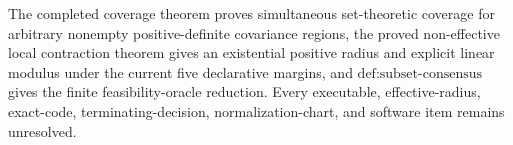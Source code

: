 The completed coverage theorem proves simultaneous set-theoretic coverage for arbitrary nonempty positive-definite covariance regions, the proved non-effective local contraction theorem gives an existential positive radius and explicit linear modulus under the current five declarative margins, and \(\text{def:subset-consensus}\) gives the finite feasibility-oracle reduction. Every executable, effective-radius, exact-code, terminating-decision, normalization-chart, and software item remains unresolved.